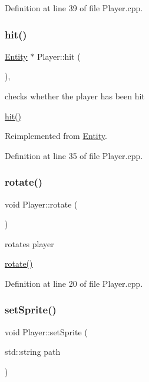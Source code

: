 Definition at line 39 of file Player.\+cpp.

\mbox{\label{class_player_a089d9293cc3be7e5d6d7c89b49538134}} 
\subsubsection{\texorpdfstring{hit()}{hit()}}
{\footnotesize\ttfamily \hyperlink{class_entity}{Entity} $\ast$ Player\+::hit (\begin{DoxyParamCaption}{ }\end{DoxyParamCaption})\hspace{0.3cm}{\ttfamily [override]}, {\ttfamily [virtual]}}



checks whether the player has been hit 

\hyperlink{class_player_a089d9293cc3be7e5d6d7c89b49538134}{hit()} 

Reimplemented from \hyperlink{class_entity_a29117f3f40e7069d5d4c1b2fca7819d6}{Entity}.



Definition at line 35 of file Player.\+cpp.

\mbox{\label{class_player_ad39abceb9ff5c7c189010f87d6b46dea}} 
\subsubsection{\texorpdfstring{rotate()}{rotate()}}
{\footnotesize\ttfamily void Player\+::rotate (\begin{DoxyParamCaption}{ }\end{DoxyParamCaption})}



rotates player 

\hyperlink{class_player_ad39abceb9ff5c7c189010f87d6b46dea}{rotate()} 

Definition at line 20 of file Player.\+cpp.

\mbox{\label{class_player_acf54fe649339974ec2f990f2f484dc3d}} 
\subsubsection{\texorpdfstring{set\+Sprite()}{setSprite()}}
{\footnotesize\ttfamily void Player\+::set\+Sprite (\begin{DoxyParamCaption}\item[{std\+::string}]{path }\end{DoxyParamCaption})}



